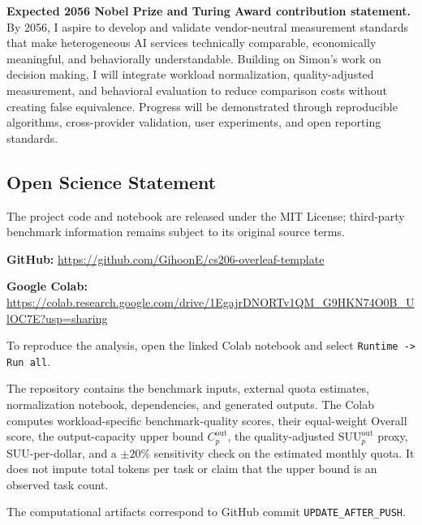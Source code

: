 \documentclass[sigconf,nonacm]{acmart}
\newcommand{\GitHubLink}{
\url{https://github.com/GihoonE/cs206-overleaf-template}
}
\newcommand{\ColabLink}{
\url{https://colab.research.google.com/drive/1EgajrDNORTv1QM_G9HKN74O0B_UlOC7E?usp=sharing}
}
\begin{document}
\vspace{0.3em}

\textbf{Expected 2056 Nobel Prize and Turing Award contribution statement.}
By 2056, I aspire to develop and validate vendor-neutral measurement standards
that make heterogeneous AI services technically comparable,
economically meaningful,
and behaviorally understandable.
Building on Simon's work on decision making,
I will integrate workload normalization,
quality-adjusted measurement,
and behavioral evaluation to reduce comparison costs without creating false
equivalence.
Progress will be demonstrated through reproducible algorithms,
cross-provider validation,
user experiments,
and open reporting standards.



\vspace{0.7em}

\subsection*{Open Science Statement}

The project code and notebook are released under the MIT License;
third-party benchmark information remains subject to its original source terms.

\textbf{GitHub:} \GitHubLink

\vspace{0.25em}

\textbf{Google Colab:} \ColabLink

To reproduce the analysis, open the linked Colab notebook and select
\texttt{Runtime -> Run all}.

\vspace{0.4em}

The repository contains the benchmark inputs, external quota estimates,
normalization notebook, dependencies, and generated outputs.
The Colab computes workload-specific benchmark-quality scores, their equal-weight
Overall score, the output-capacity upper bound $C_p^{\mathrm{out}}$, the
quality-adjusted $\mathrm{SUU}_p^{\mathrm{out}}$ proxy, SUU-per-dollar, and a
$\pm20\%$ sensitivity check on the estimated monthly quota. It does not impute
total tokens per task or claim that the upper bound is an observed task count.

The computational artifacts correspond to GitHub commit
\texttt{UPDATE\_AFTER\_PUSH}.
\end{document}
